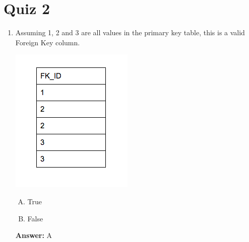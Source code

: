 \documentclass[12pt]{article}
\begin{document}
\bigskip

\section{Quiz 2}

\bigskip

\begin{enumerate}[1.]
    \item

    \bigskip

    Assuming 1, 2 and 3 are all values in the primary key table, this is a valid
    Foreign Key column.

    \begin{center}
    \includegraphics[width=0.4\linewidth]{images/part_2_notes_3.png}
    \end{center}

    \bigskip

    \begin{enumerate}[A.]
        \item True
        \item False
    \end{enumerate}

    \bigskip

    \textbf{Answer:} A


\end{enumerate}
\end{document}
